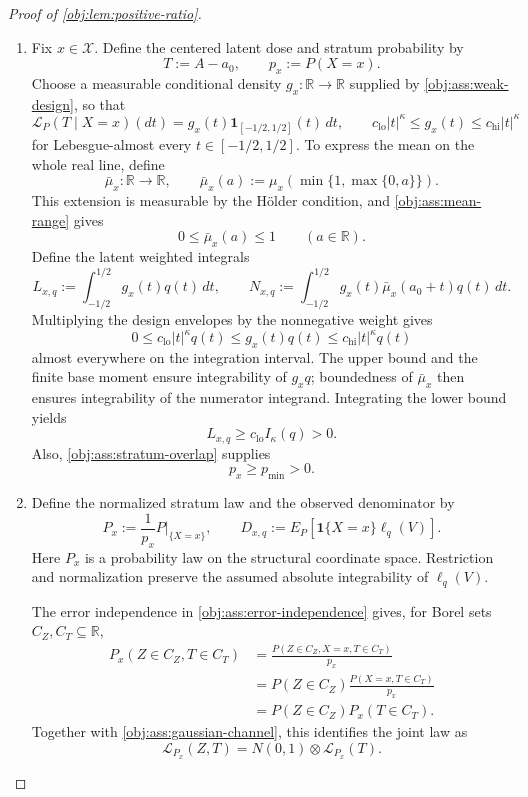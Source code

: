 \begin{proof}[Proof of \cref{obj:lem:positive-ratio}]
\begin{enumerate}
\item Fix \(x\in\mathcal X\). Define the centered latent dose and stratum probability by
\[
T:=A-a_0,\qquad p_x:=P(X=x).
\]
Choose a measurable conditional density \(g_x:\mathbb R\to\mathbb R\) supplied by \cref{obj:ass:weak-design}, so that
\[
\mathcal L_P(T\mid X=x)(dt)
=
g_x(t)\mathbf1_{[-1/2,1/2]}(t)\,dt,
\qquad
c_{\mathrm{lo}}|t|^\kappa\le g_x(t)\le c_{\mathrm{hi}}|t|^\kappa
\]
for Lebesgue-almost every \(t\in[-1/2,1/2]\). To express the mean on the whole real line, define
\[
\bar\mu_x:\mathbb R\to\mathbb R,
\qquad
\bar\mu_x(a):=\mu_x\!\left(\min\{1,\max\{0,a\}\}\right).
\]
This extension is measurable by the Hölder condition, and \cref{obj:ass:mean-range} gives
\[
0\le\bar\mu_x(a)\le1\qquad(a\in\mathbb R).
\]
Define the latent weighted integrals
\[
L_{x,q}:=\int_{-1/2}^{1/2}g_x(t)q(t)\,dt,
\qquad
N_{x,q}:=\int_{-1/2}^{1/2}
g_x(t)\bar\mu_x(a_0+t)q(t)\,dt.
\]
Multiplying the design envelopes by the nonnegative weight gives
\[
0\le c_{\mathrm{lo}}|t|^\kappa q(t)
\le g_x(t)q(t)
\le c_{\mathrm{hi}}|t|^\kappa q(t)
\]
almost everywhere on the integration interval. The upper bound and the finite base moment ensure integrability of \(g_xq\); boundedness of \(\bar\mu_x\) then ensures integrability of the numerator integrand. Integrating the lower bound yields
\[
L_{x,q}\ge c_{\mathrm{lo}} I_\kappa(q)>0.
\]
Also, \cref{obj:ass:stratum-overlap} supplies
\[
p_x\ge p_{\min}>0.
\]

\item Define the normalized stratum law and the observed denominator by
\[
P_x:=\frac{1}{p_x}P|_{\{X=x\}},
\qquad
D_{x,q}:=E_P[\mathbf1\{X=x\}\ell_q(V)].
\]
Here \(P_x\) is a probability law on the structural coordinate space. Restriction and normalization preserve the assumed absolute integrability of \(\ell_q(V)\).

The error independence in \cref{obj:ass:error-independence} gives, for Borel sets \(C_Z,C_T\subseteq\mathbb R\),
\[
\begin{aligned}
P_x(Z\in C_Z,T\in C_T)
&=\frac{P(Z\in C_Z,X=x,T\in C_T)}{p_x}\\
&=P(Z\in C_Z)\frac{P(X=x,T\in C_T)}{p_x}\\
&=P(Z\in C_Z)P_x(T\in C_T).
\end{aligned}
\]
Together with \cref{obj:ass:gaussian-channel}, this identifies the joint law as
\[
\mathcal L_{P_x}(Z,T)
=
N(0,1)\otimes\mathcal L_{P_x}(T).
\]


\end{enumerate}
\end{proof}
